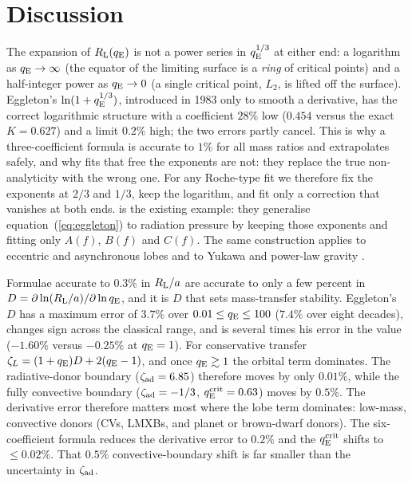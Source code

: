 \documentclass[twocolumn]{aastex702}
\newcommand{\qE}{q_{\rm E}}
\newcommand{\RL}{R_{\rm L}}
\begin{document}
\section{Discussion}\label{sec:disc}

The expansion of $\RL(\qE)$ is not a power series in $\qE^{1/3}$ at either end: a logarithm as $\qE\to\infty$ (the equator of the limiting surface is a {\em ring} of critical points) and a half-integer power as $\qE\to0$ (a single critical point, $L_2$, is lifted off the surface). Eggleton's $\ln(1+\qE^{1/3})$, introduced in 1983 only to smooth a derivative, has the correct logarithmic structure with a coefficient $28\%$ low ($0.454$ versus the exact $K=0.627$) and a limit $0.2\%$ high; the two errors partly cancel. This is why a three-coefficient formula is accurate to $1\%$ for all mass ratios and extrapolates safely, and why fits that free the exponents are not: they replace the true non-analyticity with the wrong one. For any Roche-type fit we therefore fix the exponents at $2/3$ and $1/3$, keep the logarithm, and fit only a correction that vanishes at both ends. \citet{Dermine2009} is the existing example: they generalise equation~(\ref{eq:eggleton}) to radiation pressure by keeping those exponents and fitting only $A(f)$, $B(f)$ and $C(f)$. The same construction applies to eccentric and asynchronous lobes \citep{Sepinsky2007} and to Yukawa and power-law gravity \citep{Velasquez2026}.

Formulae accurate to $0.3\%$ in $\RL/a$ are accurate to only a few percent in $D=\partial\ln(\RL/a)/\partial\ln\qE$, and it is $D$ that sets mass-transfer stability. Eggleton's $D$ has a maximum error of $3.7\%$ over $0.01\le\qE\le100$ ($7.4\%$ over eight decades), changes sign across the classical range, and is several times his error in the value ($-1.60\%$ versus $-0.25\%$ at $\qE=1$). For conservative transfer $\zeta_L=(1+\qE)D+2(\qE-1)$, and once $\qE\gtrsim1$ the orbital term dominates. The radiative-donor boundary ($\zeta_{\rm ad}=6.85$) therefore moves by only $0.01\%$, while the fully convective boundary ($\zeta_{\rm ad}=-1/3$, $\qE^{\rm crit}=0.63$) moves by $0.5\%$. The derivative error therefore matters most where the lobe term dominates: low-mass, convective donors (CVs, LMXBs, and planet or brown-dwarf donors). The six-coefficient formula reduces the derivative error to $0.2\%$ and the $\qE^{\rm crit}$ shifts to $\le0.02\%$. That $0.5\%$ convective-boundary shift is far smaller than the uncertainty in $\zeta_{\rm ad}$.
\end{document}
